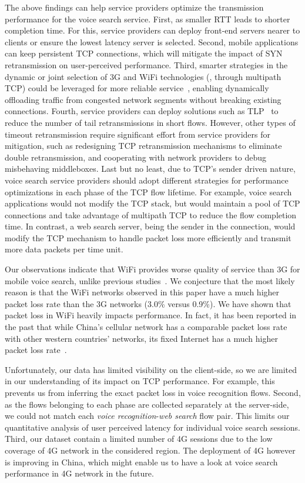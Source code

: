 The above findings can help service providers optimize the transmission performance for the voice search service. First, as smaller RTT leads to shorter completion time. For this, service providers can deploy front-end servers nearer to clients or ensure the lowest latency server is selected. Second, mobile applications can keep persistent TCP connections, which will mitigate the impact of SYN retransmission on user-perceived performance. Third, smarter strategies in the dynamic or joint selection of 3G and WiFi technologies (\eg, through multipath TCP) could be leveraged for more reliable service~\cite{UM-CS-2012-022,Chen:2013:MSM:2504730.2504751}, enabling dynamically offloading traffic from congested network segments without breaking existing connections. Fourth, service providers can deploy solutions such as TLP~\cite{flach2013reducing} to reduce the number of tail retransmissions in short flows. However, other types of timeout retransmission require significant effort from service providers for mitigation, such as redesigning TCP retransmission mechanisms to eliminate double retransmission, and cooperating with network providers to debug misbehaving middleboxes. Last but no least, due to TCP's sender driven nature, voice search service providers should adopt different strategies for performance optimizations in each phase of the TCP flow lifetime. For example, voice search applications would not modify the TCP stack, but would maintain a pool of TCP connections and take advantage of multipath TCP to reduce the flow completion time. In contrast, a web search server, being the sender in the connection, would modify the TCP mechanism to handle packet loss more efficiently and transmit more data packets per time unit.

Our observations indicate that WiFi provides worse quality of service than 3G for mobile voice search, unlike previous studies~\cite{sommers2012cell}. We conjecture that the most likely reason is that the WiFi networks observed in this paper have a much higher packet loss rate than the 3G networks (3.0\% versus 0.9\%). We have shown that packet loss in WiFi heavily impacts performance. In fact, it has been reported in the past that while China's cellular network has a comparable packet loss rate with other western countries' networks, its fixed Internet has a much higher packet loss rate~\cite{HeikkinenB12}. 

Unfortunately, our data has limited visibility on the client-side, so we are limited in our understanding of its impact on TCP performance. For example, this prevents us from inferring the exact packet loss in voice recognition flows. Second, as the flows belonging to each phase are collected separately at the server-side, we could not match each \emph{voice recognition}-\emph{web search} flow pair. This limits our quantitative analysis of user perceived latency for individual voice search sessions. Third, our dataset contain a limited number of 4G sessions due to the low coverage of 4G network in the considered region. The deployment of 4G however is improving in China, which might enable us to have a look at voice search performance in 4G network in the future.